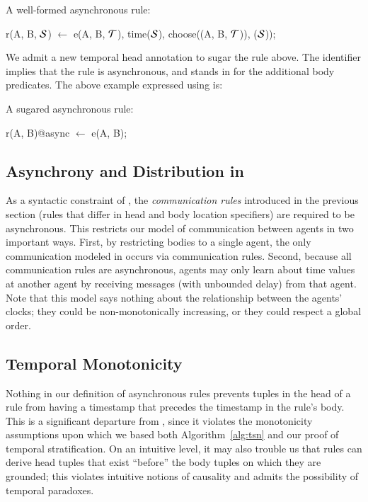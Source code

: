 \begin{example}
A well-formed asynchronous \lang rule:

\begin{Dedalus}
r(A, B, \(\SDedalus\)) \(\leftarrow\) 
  e(A, B, \(\Tau\)),
  time(\(\SDedalus\)), choose((A, B, \(\Tau\))), (\(\SDedalus\)));
\end{Dedalus}
\end{example}

We admit a new temporal head annotation to sugar the rule above.  The
identifier  implies that the rule is asynchronous, and stands in for
the additional body predicates.
The above example expressed using  is:

\begin{example}
	A sugared asynchronous \lang rule:
	
\begin{Dedalus}
r(A, B)@async \(\leftarrow\) e(A, B);
\end{Dedalus}
\end{example}

\subsection{Asynchrony and Distribution in {\large{\bf\lang}}}
As a syntactic constraint of \lang, the {\em communication rules} introduced in the previous section (rules that differ in head and body location specifiers) are required to be asynchronous.
This restricts our model of communication between agents in two important ways.
First, by restricting bodies to a single agent, the only communication
modeled in \lang occurs via communication rules.  Second, because
all communication rules are asynchronous, agents may only learn about
time values at another agent by receiving messages (with unbounded
delay) from that agent.  Note that this model says nothing about the
relationship between the agents' clocks; they could be
non-monotonically increasing, or they could respect a global order.

\subsection{Temporal Monotonicity}


Nothing in our definition of asynchronous rules prevents tuples in the
head of a rule from having a timestamp that precedes the timestamp in
the rule's body. This is a significant departure from \slang, since it
violates the monotonicity assumptions upon which we based both Algorithm~\ref{alg:tsn} and our proof of
temporal stratification.  On an intuitive level, it may also trouble
us that rules can derive head tuples that exist ``before'' the body
tuples on which they are grounded; this violates intuitive notions of
causality and admits the possibility of temporal paradoxes.

